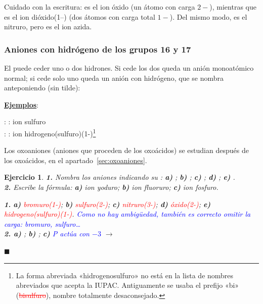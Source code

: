 \documentclass[12pt]{article}
\theoremstyle{mygreennumbox}
\newtheorem{ejercicioT}{Ejercicio}[section]
\newenvironment{exercise}{\begin{eBoxmygreen}\begin{ejercicioT}}{\hfill{\color{mygreen}\tiny\ensuremath{\blacksquare}}\end{ejercicioT}\end{eBoxmygreen}}
\newcommand{\ejemplos}{\par\noindent\textbf{\uline{Ejemplos}}:\par}
\newcommand{\mal}[1]{\textcolor{red}{\sout{#1}}}
\newcommand{\etiquetanom}[2]{\tcbox[on line, colback=#1!10, colframe=#1, boxrule=0.5pt, arc=2pt, boxsep=0pt, left=2pt, right=2pt, top=0.5pt, bottom=0.5pt]{\scriptsize\sffamily\bfseries\textcolor{#1}{#2}}}
\newcommand{\concarga}{\etiquetanom{myOrange3}{nº de carga}}
\begin{document}
\begin{marker}
    Cuidado con la escritura:  es el ion óxido (un átomo con carga \(2-\)), mientras que  es el ion dióxido(1--) (dos átomos con carga total \(1-\)). Del mismo modo,  es el nitruro, pero  es el ion azida.
\end{marker}

\subsubsection{Aniones con hidrógeno de los grupos 16 y 17}

El  puede ceder uno o dos hidrones. Si cede los dos queda un anión monoatómico normal; si cede solo uno queda un anión con hidrógeno, que se nombra anteponiendo  (sin tilde):

\ejemplos
\noindent {} : : ion sulfuro \\
 : : ion hidrogeno(sulfuro)(1-)\footnote{La forma abreviada «hidrogenosulfuro» no está en la lista de nombres abreviados que acepta la IUPAC. Antiguamente se usaba el prefijo «bi» (\mal{bisulfuro}), nombre totalmente desaconsejado.}

Los oxoaniones (aniones que proceden de los oxoácidos) se estudian después de los oxoácidos, en el apartado~\ref{sec:oxoaniones}.

\begin{exercise}
    \textbf{1.} Nombra los aniones indicando su \concarga: \textbf{a)} ; \textbf{b)} ; \textbf{c)} ; \textbf{d)} ; \textbf{e)} .\\
    \textbf{2.} Escribe la fórmula: \textbf{a)} ion yoduro; \textbf{b)} ion fluoruro; \textbf{c)} ion fosfuro.
    \begin{solu}
        \textbf{1.} \concarga{} \textbf{a)} \textcolor{red}{bromuro(1-)}; \textbf{b)} \textcolor{red}{sulfuro(2-)}; \textbf{c)} \textcolor{red}{nitruro(3-)}; \textbf{d)} \textcolor{red}{óxido(2-)}; \textbf{e)} \textcolor{red}{hidrogeno(sulfuro)(1-)}. \textcolor{blue}{Como no hay ambigüedad, también es correcto omitir la carga: bromuro, sulfuro\dots}\\
        \textbf{2. a)} \textcolor{red}{}; \textbf{b)} \textcolor{red}{}; \textbf{c)} \textcolor{blue}{P actúa con \(-3\)} \(\to\) \textcolor{red}{}
    \end{solu}
\end{exercise}
\end{document}
